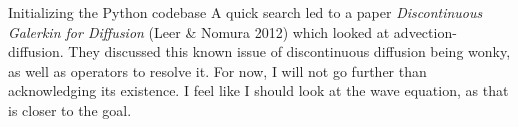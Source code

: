 \documentclass[12pt, letterpaper]{article}
\begin{document}
\begin{section}{Initializing the Python codebase}
A quick search led to a paper {\it Discontinuous Galerkin for Diffusion} (Leer \& Nomura 2012) which looked at advection-diffusion. They discussed this known issue of discontinuous diffusion being wonky, as well as operators to resolve it. For now, I will not go further than acknowledging its existence. I feel like I should look at the wave equation, as that is closer to the goal.

\end{section}
\end{document}
